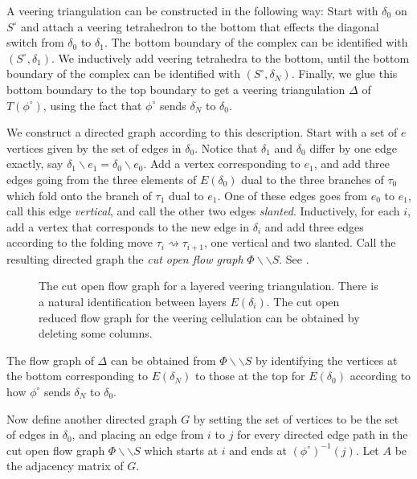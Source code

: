 \documentclass[12pt]{amsart}
\theoremstyle{definition}
\numberwithin{equation}{section}
\begin{document}
A veering triangulation can be constructed in the following way: Start with $\delta_0$ on $S^\circ$ and attach a veering tetrahedron to the bottom that effects the diagonal switch from $\delta_0$ to $\delta_1$. The bottom boundary of the complex can be identified with $(S^\circ,\delta_1)$. We inductively add veering tetrahedra to the bottom, until the bottom boundary of the complex can be identified with $(S^\circ,\delta_N)$. Finally, we glue this bottom boundary to the top boundary to get a veering triangulation $\Delta$ of $T(\phi^\circ)$, using the fact that $\phi^\circ$ sends $\delta_N$ to $\delta_0$. 

We construct a directed graph according to this description. Start with a set of $e$ vertices given by the set of edges in $\delta_0$. Notice that $\delta_1$ and $\delta_0$ differ by one edge exactly, say $\delta_1 \backslash e_1=\delta_0 \backslash e_0$. Add a vertex corresponding to $e_1$, and add three edges going from the three elements of $E(\delta_0)$ dual to the three branches of $\tau_0$ which fold onto the branch of $\tau_1$ dual to $e_1$. One of these edges goes from $e_0$ to $e_1$, call this edge \textit{vertical}, and call the other two edges \textit{slanted}. Inductively, for each $i$, add a vertex that corresponds to the new edge in $\delta_i$ and add three edges according to the folding move $\tau_i \rightsquigarrow \tau_{i+1}$, one vertical and two slanted. Call the resulting directed graph the \textit{cut open flow graph} $\Phi \backslash \backslash S$. See .

\begin{figure}
    \centering
    \fontsize{14pt}{14pt}\selectfont
    \resizebox{!}{6cm}{}
    \caption{The cut open flow graph for a layered veering triangulation. There is a natural identification between layers $E(\delta_i)$. The cut open reduced flow graph for the veering cellulation can be obtained by deleting some columns.}
    \label{fig:cutopenflowgraph}
\end{figure}

The flow graph of $\Delta$ can be obtained from $\Phi \backslash \backslash S$ by identifying the vertices at the bottom corresponding to $E(\delta_N)$ to those at the top for $E(\delta_0)$ according to how $\phi^\circ$ sends $\delta_N$ to $\delta_0$. 

Now define another directed graph $G$ by setting the set of vertices to be the set of edges in $\delta_0$, and placing an edge from $i$ to $j$ for every directed edge path in the cut open flow graph $\Phi \backslash \backslash S$ which starts at $i$ and ends at $(\phi^\circ)^{-1}(j)$. Let $A$ be the adjacency matrix of $G$. 
\end{document}
